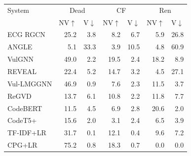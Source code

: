 \begin{tabular}{lrrrrrr}
\toprule
System & \multicolumn{2}{c}{Dead} & \multicolumn{2}{c}{CF} & \multicolumn{2}{c}{Ren} \\
 & NV$\uparrow$ & V$\downarrow$ & NV$\uparrow$ & V$\downarrow$ & NV$\uparrow$ & V$\downarrow$ \\
\midrule
ECG RGCN & 25.2 & 3.8 & 8.2 & 6.7 & 5.9 & 26.8 \\
ANGLE & 5.1 & 33.3 & 3.9 & 10.5 & 4.8 & 60.9 \\
VulGNN & 49.0 & 2.2 & 19.5 & 2.4 & 18.2 & 8.9 \\
REVEAL & 22.4 & 5.2 & 14.7 & 3.2 & 4.5 & 27.1 \\
Vul-LMGGNN & 46.9 & 0.9 & 7.6 & 2.3 & 11.5 & 3.7 \\
ReGVD & 13.7 & 6.1 & 10.8 & 2.2 & 11.8 & 7.7 \\
CodeBERT & 11.5 & 4.5 & 6.9 & 2.8 & 20.6 & 2.0 \\
CodeT5+ & 15.6 & 2.0 & 3.1 & 2.4 & 6.5 & 3.9 \\
TF-IDF+LR & 31.7 & 0.1 & 12.1 & 0.4 & 9.6 & 7.2 \\
CPG+LR & 75.2 & 0.8 & 18.3 & 0.7 & 0.0 & 0.0 \\
\bottomrule
\end{tabular}
